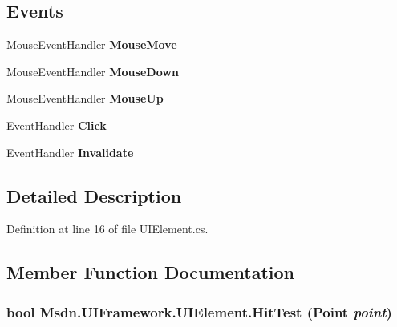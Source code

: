 \subsection*{Events}
\begin{DoxyCompactItemize}
\item 
\hypertarget{class_msdn_1_1_u_i_framework_1_1_u_i_element_a86e3dbddfbbc980c087ad0f8f612d62f}{
MouseEventHandler {\bfseries MouseMove}}
\label{class_msdn_1_1_u_i_framework_1_1_u_i_element_a86e3dbddfbbc980c087ad0f8f612d62f}

\item 
\hypertarget{class_msdn_1_1_u_i_framework_1_1_u_i_element_a7a322ef5474009250eeb7a7723a2fb9d}{
MouseEventHandler {\bfseries MouseDown}}
\label{class_msdn_1_1_u_i_framework_1_1_u_i_element_a7a322ef5474009250eeb7a7723a2fb9d}

\item 
\hypertarget{class_msdn_1_1_u_i_framework_1_1_u_i_element_a62dd135f9a076e73ab56d2891f0394fb}{
MouseEventHandler {\bfseries MouseUp}}
\label{class_msdn_1_1_u_i_framework_1_1_u_i_element_a62dd135f9a076e73ab56d2891f0394fb}

\item 
\hypertarget{class_msdn_1_1_u_i_framework_1_1_u_i_element_a53b56cb482be2252bec3ab914e1d0d7f}{
EventHandler {\bfseries Click}}
\label{class_msdn_1_1_u_i_framework_1_1_u_i_element_a53b56cb482be2252bec3ab914e1d0d7f}

\item 
\hypertarget{class_msdn_1_1_u_i_framework_1_1_u_i_element_aed78bf64a01d385d569e0c84850daba3}{
EventHandler {\bfseries Invalidate}}
\label{class_msdn_1_1_u_i_framework_1_1_u_i_element_aed78bf64a01d385d569e0c84850daba3}

\end{DoxyCompactItemize}


\subsection{Detailed Description}


Definition at line 16 of file UIElement.cs.

\subsection{Member Function Documentation}
\hypertarget{class_msdn_1_1_u_i_framework_1_1_u_i_element_a246fc87022f64df87fe39b0d5d10e396}{
\subsubsection[{HitTest}]{\setlength{\rightskip}{0pt plus 5cm}bool Msdn.UIFramework.UIElement.HitTest (Point {\em point})}}
\label{class_msdn_1_1_u_i_framework_1_1_u_i_element_a246fc87022f64df87fe39b0d5d10e396}


